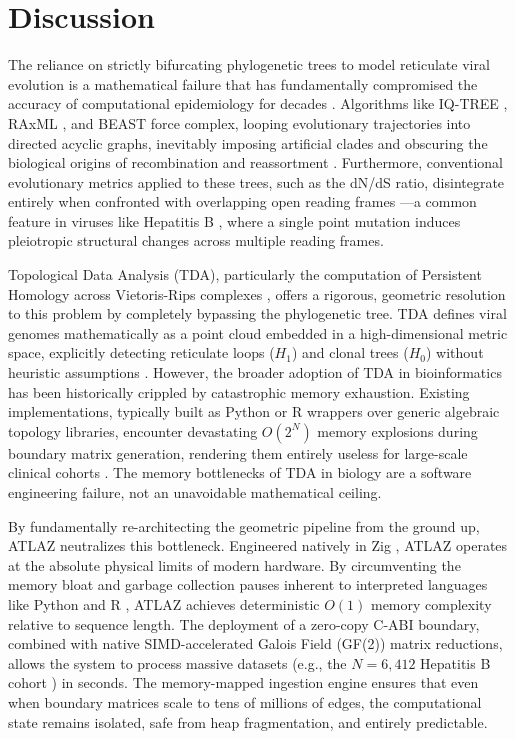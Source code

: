 \section{Discussion}

The reliance on strictly bifurcating phylogenetic trees to model reticulate viral evolution is a mathematical failure that has fundamentally compromised the accuracy of computational epidemiology for decades \citep{felsenstein1981evolutionary, huson2006application}. Algorithms like IQ-TREE \citep{nguyen2015iq}, RAxML \citep{stamatakis2014raxml}, and BEAST \citep{suchard2018bayesian} force complex, looping evolutionary trajectories into directed acyclic graphs, inevitably imposing artificial clades and obscuring the biological origins of recombination and reassortment \citep{simon2015hiv, nelson2014emergence}. Furthermore, conventional evolutionary metrics applied to these trees, such as the dN/dS ratio, disintegrate entirely when confronted with overlapping open reading frames \citep{schlub2018estimating}---a common feature in viruses like Hepatitis B \citep{zhou2012recombination}, where a single point mutation induces pleiotropic structural changes across multiple reading frames. 

Topological Data Analysis (TDA), particularly the computation of Persistent Homology across Vietoris-Rips complexes \citep{edelsbrunner2000topological, zomorodian2005computing, chan2013topology}, offers a rigorous, geometric resolution to this problem by completely bypassing the phylogenetic tree. TDA defines viral genomes mathematically as a point cloud embedded in a high-dimensional metric space, explicitly detecting reticulate loops ($H_1$) and clonal trees ($H_0$) without heuristic assumptions \citep{carlsson2009topology, lum2013extracting}. However, the broader adoption of TDA in bioinformatics has been historically crippled by catastrophic memory exhaustion. Existing implementations, typically built as Python \citep{van1995python} or R \citep{r2024} wrappers over generic algebraic topology libraries, encounter devastating $O(2^N)$ memory explosions during boundary matrix generation, rendering them entirely useless for large-scale clinical cohorts \citep{bauer2021ripser}. The memory bottlenecks of TDA in biology are a software engineering failure, not an unavoidable mathematical ceiling.

By fundamentally re-architecting the geometric pipeline from the ground up, ATLAZ neutralizes this bottleneck. Engineered natively in Zig \citep{zig2024}, ATLAZ operates at the absolute physical limits of modern hardware. By circumventing the memory bloat and garbage collection pauses inherent to interpreted languages like Python \citep{van1995python} and R \citep{r2024}, ATLAZ achieves deterministic $O(1)$ memory complexity relative to sequence length. The deployment of a zero-copy C-ABI boundary, combined with native SIMD-accelerated Galois Field (GF(2)) matrix reductions, allows the system to process massive datasets (e.g., the $N=6,412$ Hepatitis B cohort \citep{mcnaughton2019hbv}) in seconds. The memory-mapped ingestion engine ensures that even when boundary matrices scale to tens of millions of edges, the computational state remains isolated, safe from heap fragmentation, and entirely predictable.


